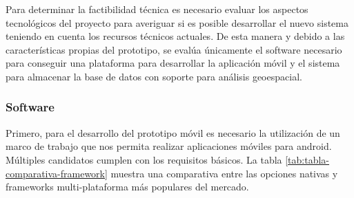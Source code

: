 Para determinar la factibilidad técnica es necesario evaluar los aspectos tecnológicos del proyecto para  averiguar si es posible desarrollar el nuevo sistema teniendo en cuenta los recursos técnicos actuales\cite{kendall_analisis}. De esta manera y debido a las características propias del prototipo, se evalúa únicamente el software necesario para conseguir una plataforma para desarrollar la aplicación móvil y el sistema para almacenar la base de datos con soporte para análisis geoespacial. 

\subsubsection{Software}
\label{subsubsec: software}
Primero, para el desarrollo del prototipo móvil es necesario la utilización de un marco de trabajo que nos permita realizar aplicaciones móviles para android. Múltiples candidatos cumplen con los requisitos básicos. La tabla \ref{tab:tabla-comparativa-framework} muestra una comparativa entre las opciones nativas y frameworks multi-plataforma más populares del mercado.


